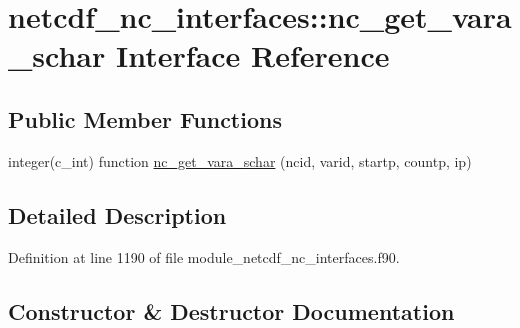 \hypertarget{interfacenetcdf__nc__interfaces_1_1nc__get__vara__schar}{}\section{netcdf\+\_\+nc\+\_\+interfaces\+:\+:nc\+\_\+get\+\_\+vara\+\_\+schar Interface Reference}
\label{interfacenetcdf__nc__interfaces_1_1nc__get__vara__schar}
\subsection*{Public Member Functions}
\begin{DoxyCompactItemize}
\item 
integer(c\+\_\+int) function \hyperlink{interfacenetcdf__nc__interfaces_1_1nc__get__vara__schar_a667874436aca6b74120f73939494dbcd}{nc\+\_\+get\+\_\+vara\+\_\+schar} (ncid, varid, startp, countp, ip)
\end{DoxyCompactItemize}


\subsection{Detailed Description}


Definition at line 1190 of file module\+\_\+netcdf\+\_\+nc\+\_\+interfaces.\+f90.



\subsection{Constructor \& Destructor Documentation}
\mbox{\label{interfacenetcdf__nc__interfaces_1_1nc__get__vara__schar_a667874436aca6b74120f73939494dbcd}} 
